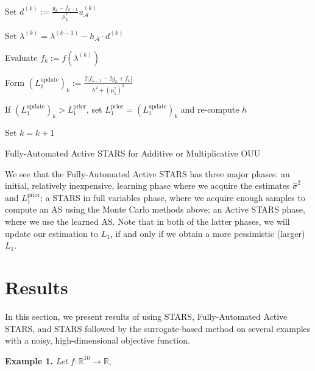 \documentclass{amsart}
\newcommand{\A}{\mathcal{A}}
\newcommand{\R}{\mathbb{R}}
\begin{document}
\begin{algorithm}[H]
{  Set $ d^{(k)}:=\frac{g_k-f_{k-1}}{\mu^*_k}u_\A^{(k)}$\;
  
  Set $\lambda^{(k)}=\lambda^{(k-1)}-h_\A\cdot d^{(k)}$\;
  
  Evaluate $f_k:=f(\lambda^{(k)})$\;
  
    Form $(L_1^\text{update})_k:=\frac{2|f_{k-1}-2g_k +f_k|}{h^2+(\mu^*_k)^2}$\;
  
  If $(L_1^\text{update})_k>L_1^\text{prior}$, set $L_1^\text{prior}=(L_1^\text{update})_k$ and re-compute $h$\;
  
  Set $k=k+1$\;}


	\caption{Fully-Automated Active STARS for Additive or Multiplicative OUU}

\end{algorithm}

\vspace{.25cm}

We see that the Fully-Automated Active STARS has three major phases: an initial, relatively inexpensive, learning phase where we acquire the estimates $\hat{\sigma}^2$ and $L_1^\text{prior}$; a STARS in full variables phase, where we acquire enough samples to compute an AS using the Monte Carlo methods above; an Active STARS phase, where we use the learned AS. Note that in both of the latter phases, we will update our estimation to $L_1$, if and only if we obtain a more pessimistic (larger) $L_1$.



\section{Results}

In this section, we present results of using STARS, Fully-Automated Active STARS, and STARS followed by the surrogate-based method on several examples with a noisy, high-dimensional objective function.

\noindent \textbf{Example 1.} \textit{Let} $f: \R^{10} \to \R ,$ 
\end{document}
